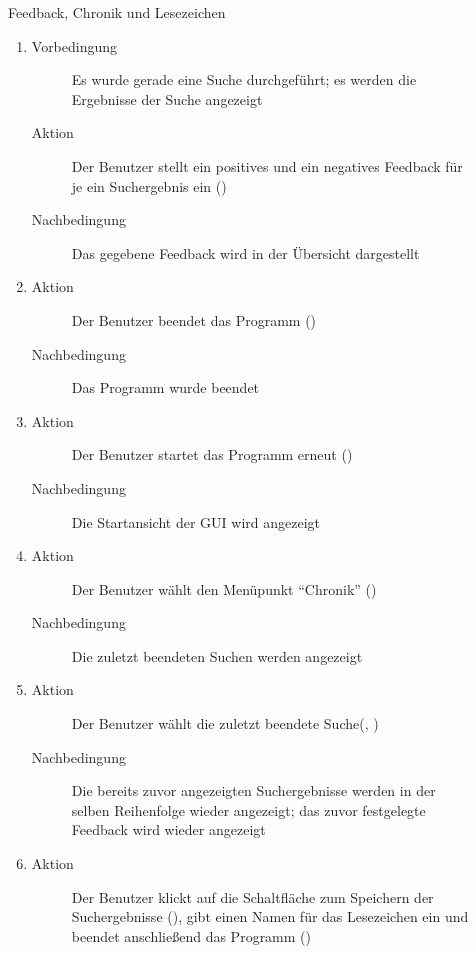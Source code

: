 \begin{description}
	\item[] Feedback, Chronik und Lesezeichen
	\begin{enumerate}
		\item
		\begin{description}
			\item[Vorbedingung] Es wurde gerade eine Suche durchgeführt; es werden die Ergebnisse der Suche angezeigt
			\item[Aktion] Der Benutzer stellt ein positives und ein negatives Feedback für je ein Suchergebnis ein ()
			\item[Nachbedingung] Das gegebene Feedback wird in der Übersicht dargestellt
		\end{description}
		\item
		\begin{description}
			\item[Aktion] Der Benutzer beendet das Programm ()
			\item[Nachbedingung] Das Programm wurde beendet
		\end{description}
		\item
		\begin{description}
			\item[Aktion] Der Benutzer startet das Programm erneut ()
			\item[Nachbedingung] Die Startansicht der GUI wird angezeigt
		\end{description}
		\item
		\begin{description}
			\item[Aktion] Der Benutzer wählt den Menüpunkt \enquote{Chronik} ()
			\item[Nachbedingung] Die zuletzt beendeten Suchen werden angezeigt
		\end{description}
		\item
		\begin{description}
			\item[Aktion] Der Benutzer wählt die zuletzt beendete Suche(, )
			\item[Nachbedingung] Die bereits zuvor angezeigten Suchergebnisse werden in der selben Reihenfolge wieder angezeigt; das zuvor festgelegte Feedback wird wieder angezeigt
		\end{description}
		\item
		\begin{description}
			\item[Aktion] Der Benutzer klickt auf die Schaltfläche zum Speichern der Suchergebnisse (), gibt einen Namen für das Lesezeichen ein und beendet anschließend das Programm ()

\end{description}
\end{enumerate}
\end{description}
